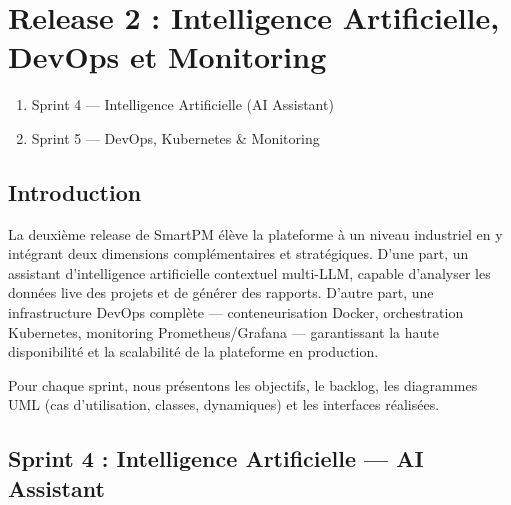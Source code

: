 \chapter{Release 2 : Intelligence Artificielle, DevOps et Monitoring}

\vspace{-0.3cm}
\begin{tcolorbox}[colback=lightgray, colframe=primaryblue,
  title=\textbf{Plan}, fonttitle=\bfseries]
  \begin{enumerate}[leftmargin=*, label=\arabic*.]
    \item Sprint 4 --- Intelligence Artificielle (AI Assistant)
    \item Sprint 5 --- DevOps, Kubernetes \& Monitoring
  \end{enumerate}
\end{tcolorbox}

\section*{Introduction}

La deuxi\`eme release de SmartPM \'el\`eve la plateforme \`a un niveau
industriel en y int\'egrant deux dimensions compl\'ementaires et strat\'egiques.
D'une part, un assistant d'intelligence artificielle contextuel multi-LLM,
capable d'analyser les donn\'ees live des projets et de g\'en\'erer des rapports.
D'autre part, une infrastructure DevOps compl\`ete --- conteneurisation Docker,
orchestration Kubernetes, monitoring Prometheus/Grafana --- garantissant la haute
disponibilit\'e et la scalabilit\'e de la plateforme en production.

\vspace{0.3cm}

Pour chaque sprint, nous pr\'esentons les objectifs, le backlog, les diagrammes
UML (cas d'utilisation, classes, dynamiques) et les interfaces r\'ealis\'ees.

\newpage
\section{Sprint 4 : Intelligence Artificielle --- AI Assistant}
\label{sec:s4}

